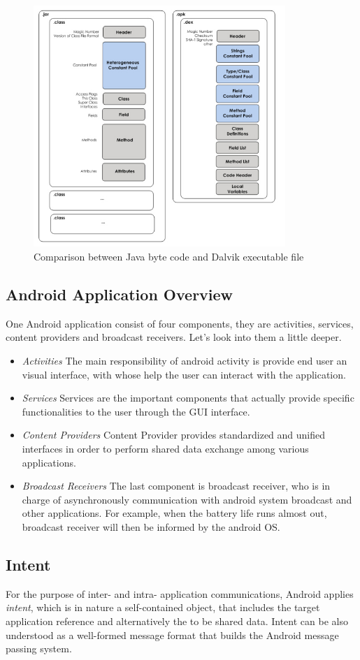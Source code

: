  \begin{figure}[!htbp]
	\centering
	\includegraphics[width=0.85\textwidth]{clas-vs-dex.jpg}
		\caption{Comparison between Java byte code and Dalvik executable file\cite{android_vm}}
	\label{fig:class-vs-dex}
\end{figure}

\subsection{Android Application Overview} \label{secAppComponents}
One Android application consist of four components, they are activities, services, content providers and broadcast receivers\cite{android_secure_design}. Let's look into them a little deeper.
\begin{itemize}
\item  \emph{Activities} The main responsibility of android activity is provide end user an visual interface, with whose help the user can interact with the application.  
\item  \emph{Services} Services are the important components that actually provide specific functionalities to the user through the  GUI interface.
\item  \emph{Content Providers} Content Provider provides standardized and unified interfaces in order to perform shared data exchange among various applications.
\item  \emph{Broadcast Receivers} The last component is broadcast receiver, who is in charge of  asynchronously communication with android system broadcast and other applications. For example, when the battery life runs almost out, broadcast receiver will then be informed by the android OS.
\end{itemize}

\subsection{Intent}
For the purpose of inter- and intra- application communications, Android applies \emph{intent}, which is in nature a self-contained object, that includes the target application reference and alternatively the to be shared data.  Intent can be also understood as a well-formed message format that builds the Android message passing system\cite{android_secure_inter}.
